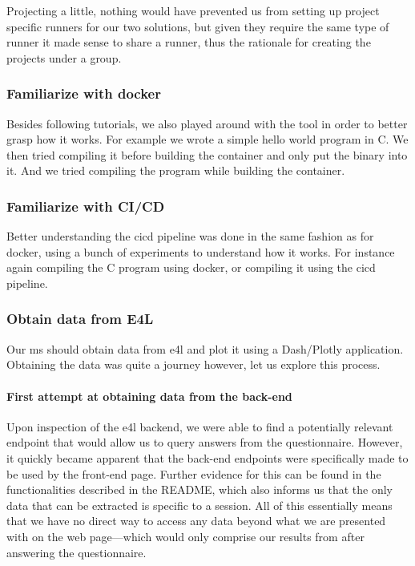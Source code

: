 Projecting a little, nothing would have prevented us from setting up
project specific runners for our two solutions, but given they require
the same type of runner it made sense to share a runner, thus the
rationale for creating the projects under a group.

\subsubsection{Familiarize with docker}

Besides following tutorials, we also played around with the tool in
order to better grasp how it works. For example we wrote a simple
hello world program in C. We then tried compiling it before building
the container and only put the binary into it. And we tried compiling
the program while building the container.

\subsubsection{Familiarize with CI/CD}

Better understanding the \gls{cicd} pipeline was done in the same
fashion as for docker, using a bunch of experiments to understand how
it works. For instance again compiling the C program using docker, or
compiling it using the \gls{cicd} pipeline.

\subsubsection{Obtain data from E4L}

Our \gls{ms} should obtain data from \gls{e4l} and plot it using
a Dash/Plotly application. Obtaining the data was quite a journey
however, let us explore this process.

\paragraph{First attempt at obtaining data from the back-end}

Upon inspection of the \gls{e4l} backend, we were able to find a
potentially relevant endpoint that would allow us to query answers
from the questionnaire.  However, it quickly became apparent that the
back-end endpoints were specifically made to be used by the front-end
page. Further evidence for this can be found in the functionalities
described in the README, which also informs us that the only data that
can be extracted is specific to a session. All of this essentially
means that we have no direct way to access any data beyond what we are
presented with on the web page---which would only comprise our results
from after answering the questionnaire.

